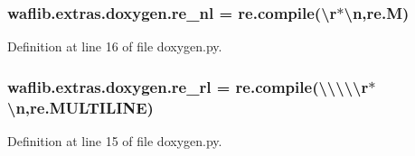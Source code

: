 \subsubsection[{\texorpdfstring{re\+\_\+nl}{re_nl}}]{\setlength{\rightskip}{0pt plus 5cm}waflib.\+extras.\+doxygen.\+re\+\_\+nl = re.\+compile(\textquotesingle{}\textbackslash{}r$\ast$\textbackslash{}n\textquotesingle{},{\bf re.\+M})}\hypertarget{namespacewaflib_1_1extras_1_1doxygen_acba87cd4b6e5f2560468766e6d53380f}{}\label{namespacewaflib_1_1extras_1_1doxygen_acba87cd4b6e5f2560468766e6d53380f}


Definition at line 16 of file doxygen.\+py.

\subsubsection[{\texorpdfstring{re\+\_\+rl}{re_rl}}]{\setlength{\rightskip}{0pt plus 5cm}waflib.\+extras.\+doxygen.\+re\+\_\+rl = re.\+compile(\textquotesingle{}\textbackslash{}\textbackslash{}\textbackslash{}\textbackslash{}\textbackslash{}r$\ast$\textbackslash{}n\textquotesingle{},re.\+M\+U\+L\+T\+I\+L\+I\+NE)}\hypertarget{namespacewaflib_1_1extras_1_1doxygen_aa95c6343f85191033a78811ba8ccd743}{}\label{namespacewaflib_1_1extras_1_1doxygen_aa95c6343f85191033a78811ba8ccd743}


Definition at line 15 of file doxygen.\+py.

